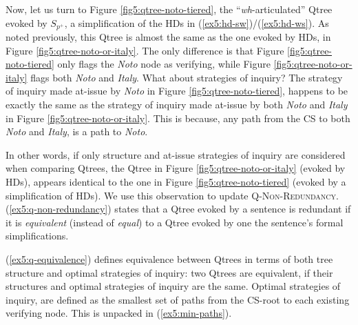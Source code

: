 Now, let us turn to Figure \ref{fig5:qtree-noto-tiered}, the ``\textit{wh}-articulated'' Qtree evoked by $S_{p^+}$, a simplification of the HDs in (\ref{ex5:hd-sw})/(\ref{ex5:hd-ws}). As noted previously, this Qtree is almost the same as the one evoked by HDs, in Figure \ref{fig5:qtree-noto-or-italy}. The only difference is that Figure \ref{fig5:qtree-noto-tiered} only flags the \textit{Noto} node as verifying, while Figure \ref{fig5:qtree-noto-or-italy} flags both \textit{Noto} and \textit{Italy}. What about strategies of inquiry? The strategy of inquiry made at-issue by \textit{Noto} in Figure \ref{fig5:qtree-noto-tiered}, happens to be exactly the same as the strategy of inquiry made at-issue by both \textit{Noto} and \textit{Italy} in Figure \ref{fig5:qtree-noto-or-italy}. This is because, any path from the CS to both \textit{Noto} and \textit{Italy}, is a path to \textit{Noto}.

In other words, if only structure and at-issue strategies of inquiry are considered when comparing Qtrees, the Qtree in Figure \ref{fig5:qtree-noto-or-italy} (evoked by HDs), appears identical to the one in Figure \ref{fig5:qtree-noto-tiered} (evoked by a simplification of HDs). We use this observation to update \textsc{Q-Non-Redundancy}. (\ref{ex5:q-non-redundancy}) states that a Qtree evoked by a sentence is redundant if it is \textit{equivalent} (instead of \textit{equal}) to a Qtree evoked by one the sentence's formal simplifications.

\begin{exe}
	\label{ex5:q-non-redundancy}
\end{exe}

(\ref{ex5:q-equivalence}) defines equivalence between Qtrees in terms of both tree structure and optimal strategies of inquiry: two Qtrees are equivalent, if their structures and optimal strategies of inquiry are the same. Optimal strategies of inquiry, are defined as the smallest set of paths from the CS-root to each existing verifying node. This is unpacked in (\ref{ex5:min-paths}).

